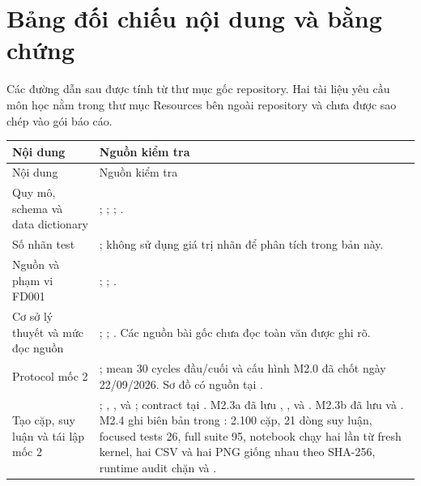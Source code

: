 \section{Bảng đối chiếu nội dung và bằng chứng}
Các đường dẫn sau được tính từ thư mục gốc repository. Hai tài liệu yêu cầu môn học nằm trong thư mục Resources bên ngoài repository và chưa được sao chép vào gói báo cáo.

\begin{longtable}{L{4.2cm}L{10.5cm}}
\toprule Nội dung & Nguồn kiểm tra\\\midrule
\endfirsthead
\toprule Nội dung & Nguồn kiểm tra\\\midrule
\endhead
Quy mô, schema và data dictionary & ; ; ; .\\[0.5em]
Số nhãn test & ; không sử dụng giá trị nhãn để phân tích trong bản này.\\[0.5em]
Nguồn và phạm vi FD001 & ; ; .\\[0.5em]
Cơ sở lý thuyết và mức đọc nguồn & ; ; . Các nguồn bài gốc chưa đọc toàn văn được ghi rõ.\\[0.5em]
Protocol mốc 2 & ; mean 30 cycles đầu/cuối và cấu hình M2.0 đã chốt ngày 22/09/2026. Sơ đồ có nguồn tại .\\[0.5em]
Tạo cặp, suy luận và tái lập mốc 2 & ; , ,  và ; contract tại . M2.3a đã lưu , ,  và . M2.3b đã lưu  và . M2.4 ghi biên bản trong : 2.100 cặp, 21 dòng suy luận, focused tests 26, full suite 95, notebook chạy hai lần từ fresh kernel, hai CSV và hai PNG giống nhau theo SHA-256, runtime audit chặn  và .\\[0.5em]

\end{longtable}
